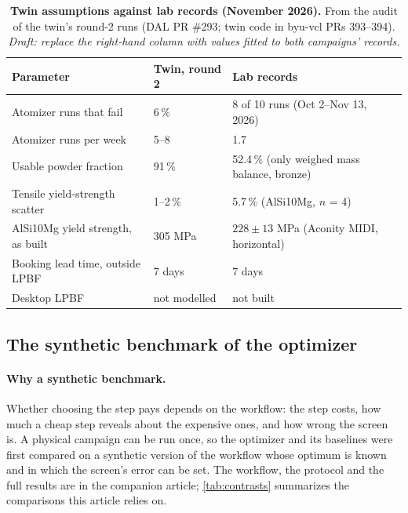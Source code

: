 \documentclass[11pt]{article}
\begin{document}
\begin{table}[h]
\centering
\caption{\textbf{Twin assumptions against lab records (November 2026).} From the
audit of the twin's round-2 runs (DAL PR \#293; twin code in byu-vcl PRs 393--394).
\ifdraft\textit{Draft: replace the right-hand column with values fitted to
both campaigns' records.}\fi}
\label{tab:Stwin}
\small
\begin{tabular}{@{}lll@{}}
\toprule
Parameter & Twin, round 2 & Lab records \\
\midrule
Atomizer runs that fail & 6\,\% & 8 of 10 runs (Oct 2--Nov 13, 2026) \\
Atomizer runs per week & 5--8 & 1.7 \\
Usable powder fraction & 91\,\% & 52.4\,\% (only weighed mass balance, bronze) \\
Tensile yield-strength scatter & 1--2\,\% & 5.7\,\% (AlSi10Mg, $n$ = 4) \\
AlSi10Mg yield strength, as built & 305 MPa & $228\pm13$ MPa (Aconity MIDI, horizontal) \\
Booking lead time, outside LPBF & 7 days & 7 days \\
Desktop LPBF & not modelled & not built \\
\bottomrule
\end{tabular}
\end{table}

\subsection*{The synthetic benchmark of the optimizer}

\paragraph{Why a synthetic benchmark.} Whether choosing the step pays depends on
the workflow: the step costs, how much a cheap step reveals about the expensive
ones, and how wrong the screen is. A physical campaign can be run once, so the
optimizer and its baselines were first compared on a synthetic version of the
workflow whose optimum is known and in which the screen's error can be set.
\ifbofnfull\else The workflow, the protocol and the full results are in the
companion article;\bofncite{} \cref{tab:contrasts} summarizes the comparisons
this article relies on.\fi
\ifbofnfull
\end{document}
